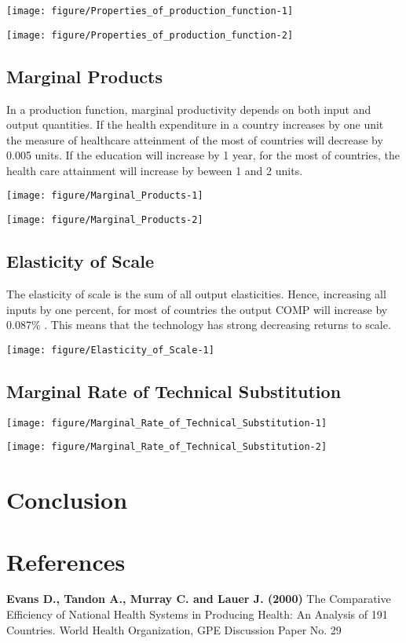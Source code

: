 \documentclass[12pt,a4paper]{article}\usepackage[]{graphicx}\usepackage[]{color}
\makeatletter
\def\maxwidth{ %
  \ifdim\Gin@nat@width>\linewidth
    \linewidth
  \else
    \Gin@nat@width
  \fi
}
\makeatother
\begin{document}
\texttt{[image: figure/Properties\_of\_production\_function-1]} 

\texttt{[image: figure/Properties\_of\_production\_function-2]} 

\subsection{Marginal Products}
In a production function, marginal productivity depends on both input and output 
quantities.
If the health expenditure in a country increases  by one unit 
the measure of healthcare atteinment of the most of countries 
will decrease by 0.005 units.
If the education will increase by 1 year, for the most of  countries, the 
health care attainment will increase by beween 1 and 2 units.


\texttt{[image: figure/Marginal\_Products-1]} 

\texttt{[image: figure/Marginal\_Products-2]} 


\subsection{Elasticity of Scale}
The elasticity of scale is the sum of all output elasticities. Hence, increasing all  inputs by one percent, for most of countries
the output COMP will increase by 0.087\% .
This means that the technology has strong decreasing returns to scale.

\texttt{[image: figure/Elasticity\_of\_Scale-1]} 

\subsection{Marginal Rate of Technical Substitution}


\texttt{[image: figure/Marginal\_Rate\_of\_Technical\_Substitution-1]} 

\texttt{[image: figure/Marginal\_Rate\_of\_Technical\_Substitution-2]} 



\section{Conclusion}



\newpage
\section{References}
\textbf{Evans D., Tandon A., Murray C. and Lauer J. (2000)} The Comparative Efficiency of National Health Systems in Producing Health: An Analysis of 191 Countries. World Health Organization, GPE Discussion Paper No. 29 \\
\end{document}
